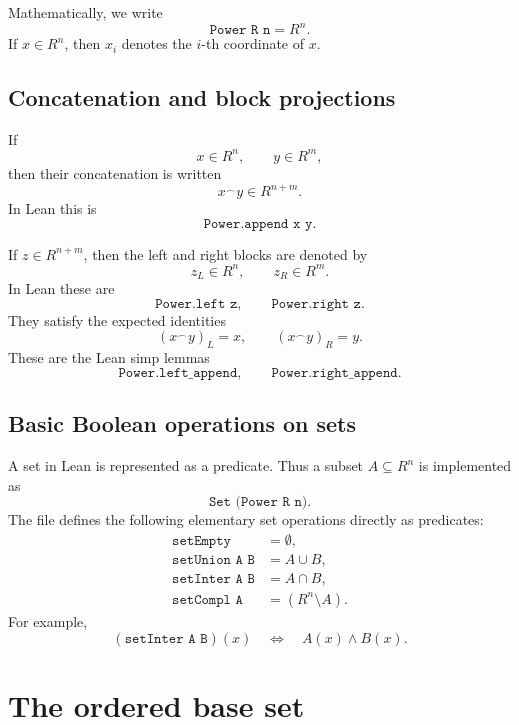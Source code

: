 \documentclass[11pt]{article}
\newcommand{\cat}{\mathbin{{}^\frown}}
\newcommand{\Lean}[1]{\texttt{#1}}
\begin{document}
Mathematically, we write
\[
  \Lean{Power R n}=R^n.
\]
If $x\in R^n$, then $x_i$ denotes the $i$-th coordinate of $x$.

\subsection{Concatenation and block projections}

If
\[
  x\in R^n,
  \qquad
  y\in R^m,
\]
then their concatenation is written
\[
  x\cat y\in R^{n+m}.
\]
In Lean this is
\[
  \Lean{Power.append x y}.
\]

If $z\in R^{n+m}$, then the left and right blocks are denoted by
\[
  z_L\in R^n,
  \qquad
  z_R\in R^m.
\]
In Lean these are
\[
  \Lean{Power.left z},
  \qquad
  \Lean{Power.right z}.
\]
They satisfy the expected identities
\[
  (x\cat y)_L=x,
  \qquad
  (x\cat y)_R=y.
\]
These are the Lean simp lemmas
\[
  \Lean{Power.left\_append},
  \qquad
  \Lean{Power.right\_append}.
\]

\subsection{Basic Boolean operations on sets}

A set in Lean is represented as a predicate.  Thus a subset $A\subseteq R^n$ is implemented as
\[
  \Lean{Set (Power R n)}.
\]
The file defines the following elementary set operations directly as predicates:
\[
\begin{aligned}
  \Lean{setEmpty} &= \emptyset,\\
  \Lean{setUnion A B} &= A\cup B,\\
  \Lean{setInter A B} &= A\cap B,\\
  \Lean{setCompl A} &= (R^n\setminus A).
\end{aligned}
\]
For example,
\[
  (\Lean{setInter A B})(x)
  \quad\Longleftrightarrow\quad
  A(x)\land B(x).
\]

\section{The ordered base set}
\end{document}
